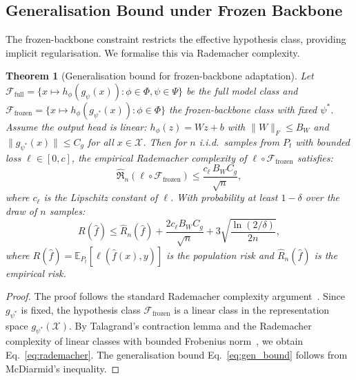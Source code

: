 \documentclass[11pt,a4paper]{article}
\newtheorem{theorem}{Theorem}
\begin{document}
\subsection{Generalisation Bound under Frozen Backbone}
\label{sec:theory_gen}

The frozen-backbone constraint restricts the effective hypothesis class, providing implicit regularisation. We formalise this via Rademacher complexity.

\begin{theorem}[Generalisation bound for frozen-backbone adaptation]
\label{thm:generalization}
Let $\mathcal{F}_{\text{full}} = \{x \mapsto h_\phi(g_\psi(x)) : \phi \in \Phi, \psi \in \Psi\}$ be the full model class and $\mathcal{F}_{\text{frozen}} = \{x \mapsto h_\phi(g_{\psi^*}(x)) : \phi \in \Phi\}$ the frozen-backbone class with fixed $\psi^*$. Assume the output head is linear: $h_\phi(z) = W z + b$ with $\|W\|_F \leq B_W$ and $\|g_{\psi^*}(x)\| \leq C_g$ for all $x \in \mathcal{X}$. Then for $n$ i.i.d.\ samples from $P_t$ with bounded loss $\ell \in [0, c]$, the empirical Rademacher complexity of $\ell \circ \mathcal{F}_{\text{frozen}}$ satisfies:
\begin{equation}
    \hat{\mathfrak{R}}_n(\ell \circ \mathcal{F}_{\text{frozen}}) \leq \frac{c_\ell \, B_W C_g}{\sqrt{n}},
    \label{eq:rademacher}
\end{equation}
where $c_\ell$ is the Lipschitz constant of $\ell$. With probability at least $1 - \delta$ over the draw of $n$ samples:
\begin{equation}
    R(\hat{f}) \leq \hat{R}_n(\hat{f}) + \frac{2 c_\ell B_W C_g}{\sqrt{n}} + 3\sqrt{\frac{\ln(2/\delta)}{2n}},
    \label{eq:gen_bound}
\end{equation}
where $R(\hat{f}) = \mathbb{E}_{P_t}[\ell(\hat{f}(x), y)]$ is the population risk and $\hat{R}_n(\hat{f})$ is the empirical risk.
\end{theorem}

\begin{proof}
The proof follows the standard Rademacher complexity argument~\citep{bartlett2002rademacher}. Since $g_{\psi^*}$ is fixed, the hypothesis class $\mathcal{F}_{\text{frozen}}$ is a linear class in the representation space $g_{\psi^*}(\mathcal{X})$. By Talagrand's contraction lemma and the Rademacher complexity of linear classes with bounded Frobenius norm~\citep{bartlett2002rademacher}, we obtain Eq.~\ref{eq:rademacher}. The generalisation bound Eq.~\ref{eq:gen_bound} follows from McDiarmid's inequality.
\end{proof}
\end{document}
